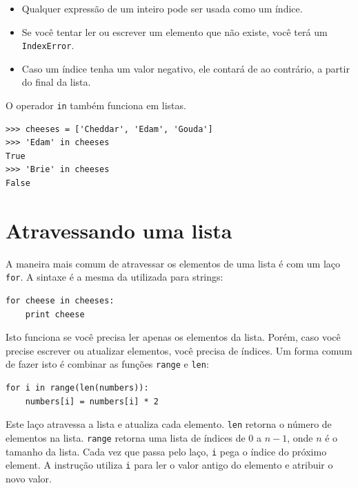 \begin{itemize}

\item Qualquer expressão de um inteiro pode ser usada como um índice.

\item Se você tentar ler ou escrever um elemento que não existe, você
terá um {\tt IndexError}.


\item Caso um índice tenha um valor negativo, ele contará de ao contrário,
a partir do final da lista.

\end{itemize}




O operador {\tt in} também funciona em listas.

\beforeverb
\begin{verbatim}
>>> cheeses = ['Cheddar', 'Edam', 'Gouda']
>>> 'Edam' in cheeses
True
>>> 'Brie' in cheeses
False
\end{verbatim}
\afterverb


\section{Atravessando uma lista}

A maneira mais comum de atravessar os elementos de uma lista é
com um laço {\tt for}. A sintaxe é a mesma da utilizada para strings:

\beforeverb
\begin{verbatim}
for cheese in cheeses:
    print cheese
\end{verbatim}
\afterverb
%
Isto funciona se você precisa ler apenas os elementos da lista.
Porém, caso você precise escrever ou atualizar elementos, você
precisa de índices. Um forma comum de fazer isto é combinar as
funções {\tt range} e {\tt len}:


\beforeverb
\begin{verbatim}
for i in range(len(numbers)):
    numbers[i] = numbers[i] * 2
\end{verbatim}
\afterverb
%
Este laço atravessa a lista e atualiza cada elemento. {\tt len}
retorna o número de elementos na lista. {\tt range} retorna uma
lista de índices de 0 a $n-1$, onde $n$ é o tamanho da lista.
Cada vez que passa pelo laço, {\tt i} pega o índice do próximo
element. A instrução utiliza {\tt i} para ler o valor antigo do
elemento e atribuir o novo valor.

